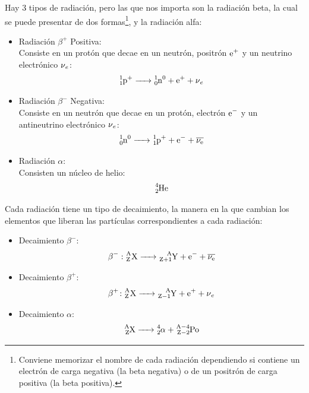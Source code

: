 \documentclass[arial,a4paper,print]{article}
\begin{document}
Hay 3 tipos de radiación, pero las que nos importa son la radiación beta, la cual se puede presentar de dos formas\footnote{Conviene memorizar el nombre de cada radiación dependiendo si contiene un electrón de carga negativa (la beta negativa) o de un positrón de carga positiva (la beta positiva).}, y la radiación alfa:
\begin{itemize}
	\item Radiación $\beta^{+}$ Positiva: \\
	Consiste en un protón que decae en un neutrón, positrón $\ce{e^+}$ y un neutrino electrónico $\ce{\nu_e}$:
	\begin{equation*}
		\ce{^{1}_{1}p^{+} -> ^{1}_{0}n^{0} + e^{+} + \nu_{e}}
	\end{equation*}

	\item Radiación $\beta^{-}$ Negativa: \\
	Consiste en un neutrón que decae en un protón, electrón $\ce{e^-}$ y un antineutrino electrónico $\ce{\nu_e}$:
	\begin{equation*}
		\ce{^{1}_{0}n^{0} -> ^{1}_{1}p^{+} + e^{-} + \overline{\nu_{e}}}
	\end{equation*}

	\item Radiación $\alpha$: \\
	Consisten un núcleo de helio:
	\begin{equation*}
		\ce{^{4}_{2}He}
	\end{equation*}
\end{itemize}

Cada radiación tiene un tipo de decaimiento, la manera en la que cambian los elementos que liberan las partículas correspondientes a cada radiación:
\begin{itemize}
	\item Decaimiento $\beta^{-}$: \\
	\begin{equation*}
		\ce{\beta^{-} \colon^A_ZX -> ^A_{Z+1}Y + e^{-} + \overline{\nu_{e}}}
	\end{equation*}
	
	\item Decaimiento $\beta^{+}$: \\
	\begin{equation*}
		\ce{\beta^{+}\colon ^A_ZX -> ^A_{Z-1}Y + e^{+} + \nu_{e}}
	\end{equation*}

	\item Decaimiento $\alpha$: \\
	\begin{equation*}
		\ce{^A_{Z}X -> ^4_2\alpha_ + ^{A-4}_{Z-2}Po}
	\end{equation*}
\end{itemize}
\end{document}
